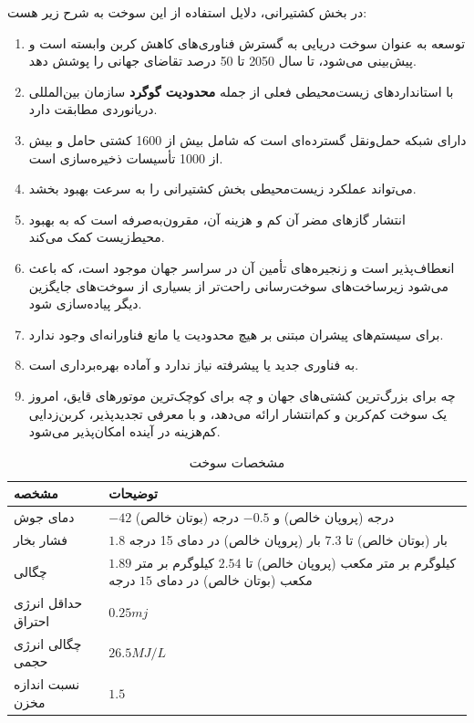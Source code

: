 در بخش کشتیرانی،
دلایل استفاده از این سوخت به شرح زیر هست:
\begin{enumerate}
	\item 
	توسعه 
	 به عنوان سوخت دریایی به گسترش فناوری‌های کاهش کربن وابسته است و پیش‌بینی می‌شود،
	  تا سال 2050 تا 50 درصد تقاضای جهانی را پوشش دهد.
	\item 
	 با استانداردهای زیست‌محیطی فعلی از جمله 
	 \textbf{محدودیت گوگرد} سازمان بین‌المللی دریانوردی 
	  مطابقت دارد.
	\item 
	دارای شبکه حمل‌ونقل گسترده‌ای است که شامل بیش از 1600 کشتی حامل 
	 و بیش از 1000 تأسیسات ذخیره‌سازی است.
	\item  
	می‌تواند عملکرد زیست‌محیطی بخش کشتیرانی را به سرعت بهبود بخشد.
	\item 
	انتشار گازهای مضر آن کم و هزینه آن، مقرون‌به‌صرفه است که به بهبود محیط‌زیست کمک می‌کند.
	\item 
	 انعطاف‌پذیر است و زنجیره‌های تأمین آن در سراسر جهان موجود است، که باعث می‌شود زیرساخت‌های سوخت‌رسانی راحت‌تر از بسیاری از سوخت‌های جایگزین دیگر پیاده‌سازی شود.
	 \item 
	 برای سیستم‌های پیشران مبتنی بر
هیچ محدودیت یا مانع فناورانه‌ای وجود ندارد.
	 \item	
	  به فناوری جدید یا پیشرفته نیاز ندارد و آماده بهره‌برداری است.
	 \item 
	 چه برای بزرگ‌ترین کشتی‌های جهان و چه برای کوچک‌ترین موتورهای قایق،
	  امروز یک سوخت کم‌کربن و کم‌انتشار ارائه می‌دهد، و با معرفی 
	  تجدیدپذیر، کربن‌زدایی کم‌هزینه در آینده امکان‌پذیر می‌شود.
\end{enumerate}
	 
\newpage

\begin{table}[h!]
	\centering
	\caption{مشخصات سوخت }
	\label{dsd}
	\begin{tabular}{|m{2cm}|m{12cm}|}
		\hline
		\textbf{مشخصه} & \textbf{توضیحات} \\
		\hline
		دمای جوش   & $-42$ درجه (پروپان خالص) و $-0.5$ درجه (بوتان خالص) \\
		فشار بخار & $1.8$ بار (بوتان خالص) تا $7.3$ بار (پروپان خالص) در دمای 15 درجه\\
		 چگالی & $1.89$ کیلوگرم بر متر مکعب (پروپان خالص) تا $2.54$ کیلوگرم بر متر مکعب (بوتان خالص) در دمای $15$ ‌درجه \\
		حداقل انرژی احتراق & $ 0.25 mj$\\
		چگالی انرژی حجمی &  $  26.5MJ/L $   \\
		نسبت اندازه مخزن & $1.5$  \\
		\hline
	\end{tabular}
\end{table}

